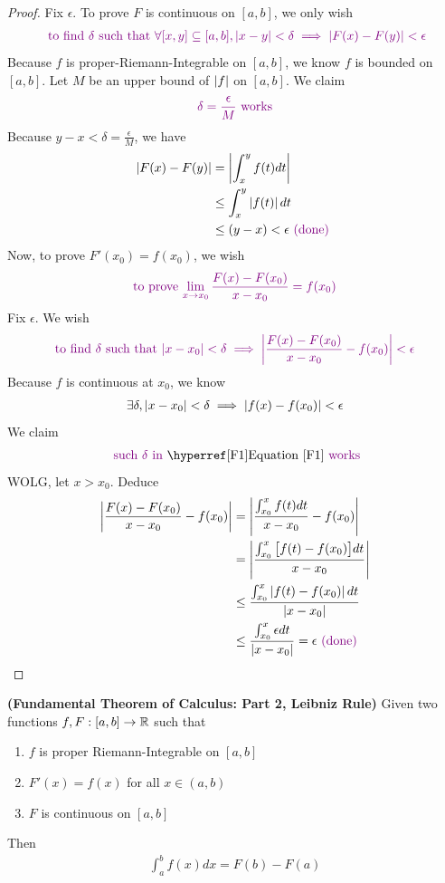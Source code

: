 \documentclass{report}
\begin{document}
\begin{proof}
Fix $\epsilon $. To prove $F$ is continuous on  $[a,b]$, we only wish 
\begin{align*}
\textcolor{violet}{\text{ to find $\delta$ such that $\forall [x,y]\subseteq [a,b], \left|x-y\right|<\delta \implies \left|F(x)-F(y)\right|<\epsilon $}}
\end{align*}
Because $f $ is proper-Riemann-Integrable on $[a,b]$, we know $f$ is bounded on  $[a,b]$. Let $M$ be an upper bound of  $\left|f\right|$ on $[a,b]$. We claim 
\begin{align*}
\textcolor{violet}{\text{ $\delta=\frac{\epsilon}{M}$ works }} 
\end{align*}
Because $y-x <\delta=\frac{\epsilon}{M}$, we have
\begin{align*}
  \left|F(x)-F(y)\right|&=\left|\int_x^y f(t)dt\right|\\
  &\leq \int_x^y \left|f(t)\right|dt\\
  &\leq (y-x)<\epsilon \textcolor{violet}{\text{ (done) }}
\end{align*}
Now, to prove $F'(x_0)=f(x_0)$, we wish 
\begin{align*}
  \textcolor{violet}{\text{ to prove $\lim_{x\to x_0} \frac{F(x)-F(x_0)}{x-x_0}= f(x_0)$ }}
\end{align*}
Fix $\epsilon $. We wish 
\begin{align*}
\textcolor{violet}{\text{ to find $\delta$ such that $\left|x-x_0\right|<\delta \implies \left|\frac{F(x)-F(x_0)}{x-x_0}-f(x_0)\right|<\epsilon $ }}
\end{align*}
Because $f$ is continuous at $x_0$, we know  
\begin{align}
\label{F1}
\exists \delta, \left|x-x_0\right|<\delta \implies \left|f(x)-f(x_0)\right|<\epsilon 
\end{align}
We claim 
\begin{align*}
\vi{\text{ such $\delta$ in}}\text{ \myref{Equation}{F1} }\vi{\text{works}}
\end{align*}
WOLG, let $x>x_0$. Deduce 
\begin{align*}
\left|\frac{F(x)-F(x_0)}{x-x_0}-f(x_0)\right|&=\left|\frac{\int_{x_0}^x f(t)dt}{x-x_0}-f(x_0)\right|\\
&=\left|\frac{\int_{x_0}^x \big[f(t)-f(x_0) \big]dt}{x-x_0}\right|\\
&\leq \frac{\int_{x_0}^x \left|f(t)-f(x_0)\right|dt}{\left|x-x_0\right|}\\
&\leq \frac{\int_{x_0}^x \epsilon dt}{\left|x-x_0\right|}=\epsilon \textcolor{violet}{\text{ (done) }}
\end{align*}
\end{proof}
\begin{theorem}
\label{FTC2}
\textbf{(Fundamental Theorem of Calculus: Part 2, Leibniz Rule)} Given two functions $f,F:[a,b]\rightarrow \mathbb{R}$ such that 
\begin{enumerate}[label=(\alph*)]
  \item $f$ is proper Riemann-Integrable on $[a,b]$ 
\item $F'(x)=f(x)$ for all $x\in (a,b)$ 
\item $F$ is continuous on $[a,b]$
\end{enumerate}
Then 
\begin{align*}
\int_a^b f(x)dx=F(b)-F(a)
\end{align*}
\end{theorem}
\end{document}
